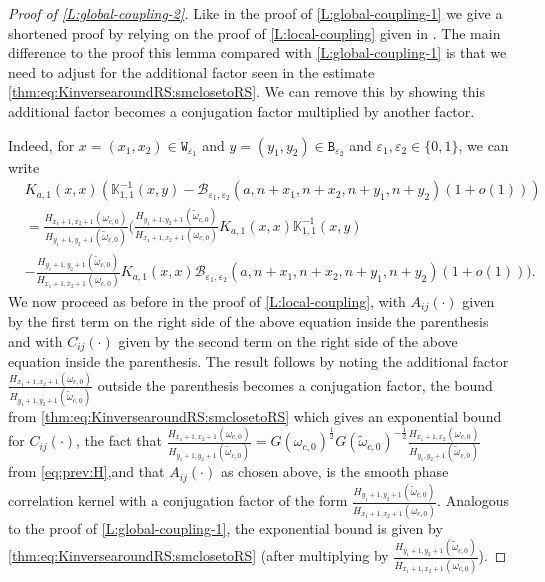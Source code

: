 \documentclass[11pt,twoside]{amsart}
\theoremstyle{plain}
\numberwithin{quest}{section}
\theoremstyle{remark}
\numberwithin{rem}{section}
\theoremstyle{definition}
\newcommand{\eps}{\varepsilon}
\begin{document}
	\begin{proof}[Proof of \cref{L:global-coupling-2}]
		Like in the proof of \cref{L:global-coupling-1} we give a shortened proof by relying on the proof of \cref{L:local-coupling} given in \cite[Proposition 4.5]{BCJ22}. The main difference to the proof this lemma compared with \cref{L:global-coupling-1} is that  we need to adjust for the additional factor seen in the estimate \eqref{thm:eq:KinversearoundRS:smclosetoRS}. We can remove this by showing this additional factor becomes a conjugation factor multiplied by another factor.
		
		Indeed, for $x=(x_1,x_2) \in \mathtt{W}_{\eps_1}$ and $y=(y_1,y_2) \in \mathtt{B}_{\eps_2}$ and $\eps_1,\eps_2 \in \{0,1\}$, we can write
		\begin{equation*}
			\begin{split}
				&K_{a,1}(x,x)(\mathbb{K}_{1,1}^{-1}(x,y)-\mathcal{B}_{\eps_1,\eps_2}(a,n+x_1,n+x_2,n+y_1,n+y_2)(1+o(1)))\\
				&= \frac{H_{x_1+1,x_2+1}(\omega_{c,0})}{H_{y_1+1,y_2+1}(\tilde{\omega}_{c,0})} \bigg(\frac{H_{y_1+1,y_2+1}(\tilde{\omega}_{c,0})}{H_{x_1+1,x_2+1}(\omega_{c,0})}K_{a,1}(x,x)\mathbb{K}_{1,1}^{-1}(x,y)\\ 
				&- \frac{H_{y_1+1,y_2+1}(\tilde{\omega}_{c,0})}{H_{x_1+1,x_2+1}(\omega_{c,0})}K_{a,1}(x,x)\mathcal{B}_{\eps_1,\eps_2}(a,n+x_1,n+x_2,n+y_1,n+y_2)(1+o(1))\bigg).
			\end{split}
		\end{equation*}
		We now proceed as before in the proof of \cref{L:local-coupling},  with $A_{ij}(\cdot)$ given by the first term on the right side of the above equation inside the parenthesis and with $C_{ij}(\cdot)$ given by the second term on the right side of the above equation inside the parenthesis.  The result follows by noting the additional factor $\frac{H_{x_1+1,x_2+1}(\omega_{c,0})}{H_{y_1+1,y_2+1}(\tilde{\omega}_{c,0})}$ outside the parenthesis becomes a conjugation factor, the bound from \eqref{thm:eq:KinversearoundRS:smclosetoRS} which gives an exponential bound for $C_{ij}(\cdot)$, the fact that  $\frac{H_{x_1+1,x_2+1}(\omega_{c,0})}{H_{y_1+1,y_2+1}(\tilde{\omega}_{c,0})}=G(\omega_{c,0})^{\frac{1}{2}}G(\tilde{\omega}_{c,0})^{-\frac{1}{2}}\frac{H_{x_1+1,x_2}(\omega_{c,0})}{H_{y_1,y_2+1}(\tilde{\omega}_{c,0})}$ from \eqref{eq:prev:H},and that $A_{ij}(\cdot)$ as chosen above, is the smooth phase correlation kernel with a conjugation factor of the form $\frac{H_{y_1+1,y_2+1}(\tilde{\omega}_{c,0})}{H_{x_1+1,x_2+1}(\omega_{c,0})}$.  Analogous to the proof of \cref{L:global-coupling-1}, the exponential bound is given by \eqref{thm:eq:KinversearoundRS:smclosetoRS} (after multiplying by $\frac{H_{y_1+1,y_2+1}(\tilde{\omega}_{c,0})}{H_{x_1+1,x_2+1}(\omega_{c,0})}$).
	\end{proof}
	
\end{document}
